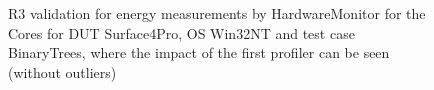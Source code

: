 \begin{figure}
                            \caption{R3 validation for energy measurements by HardwareMonitor for the Cores for DUT Surface4Pro, OS Win32NT and test case BinaryTrees, where the impact of the first profiler can be seen (without outliers)} \label{fig:Surface4Pro_HardwareMonitor_Cores_R3_energy_without_outliers_Win32NT_avg_watts}
                            \end{figure}
                            